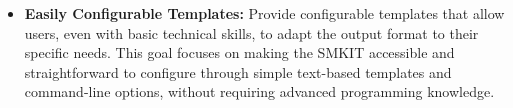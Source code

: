 \begin{itemize}
    \item \textbf{Easily Configurable Templates:} Provide configurable templates that allow users, even with basic technical skills, to adapt the output format to their specific needs. This goal focuses on making the SMKIT accessible and straightforward to configure through simple text-based templates and command-line options, without requiring advanced programming knowledge.
\end{itemize}

\begin{comment}
\section{Research Questions}
\label{sec:research_questions}
This thesis aims to address the following key research questions, which guide the development and evaluation of the modular Social Media Kit (SMKIT):

\begin{itemize}
    \item \textbf{RQ1: How can a modular framework be designed to effectively automate the process of content extraction, analysis, and posting across multiple platforms?}
    \\This question explores the architectural and design choices necessary to build a scalable, modular framework that can handle a wide range of content types, metadata formats, and platform requirements.

    \item \textbf{RQ2: What are the most efficient techniques for extracting and analyzing metadata from diverse web sources, including Open Graph tags, and how can these be integrated into the SMKIT?}
    \\This question focuses on identifying and implementing robust methods for extracting and analyzing metadata from web pages to ensure the quality and relevance of the content posted.

    \item \textbf{RQ3: How can the SMKIT be extended to support both generic web content and specialized content from specific websites, such as Negapedia?}
    \\This question investigates how the framework can be designed to allow for easy customization and extension to handle different content types and unique data formats, with a focus on the Negapedia module as a case study.

    \item \textbf{RQ4: What are the challenges and potential solutions for ensuring that the SMKIT remains adaptable and scalable in response to changes in platform APIs, metadata standards, and content types?}
    \\This question examines the long-term sustainability of the SMKIT by exploring how it can be adapted to cope with evolving technologies and requirements.


\end{comment}
